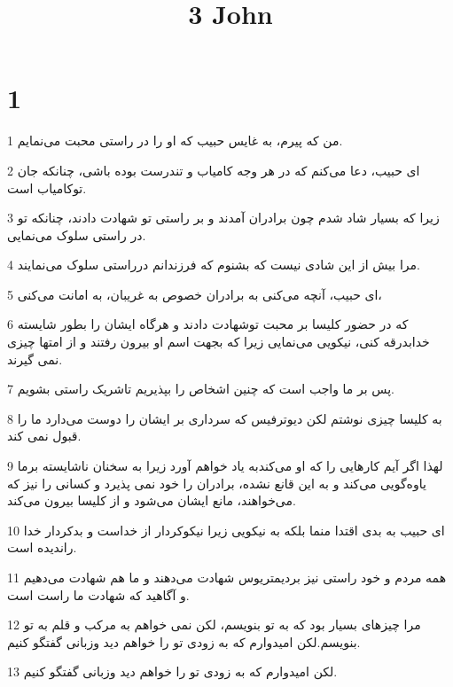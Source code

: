 

\title{3 John}


\chapter{1}

\par 1 من که پیرم، به غایس حبیب که او را در راستی محبت می‌نمایم.
\par 2 ‌ای حبیب، دعا می‌کنم که در هر وجه کامیاب و تندرست بوده باشی، چنانکه جان توکامیاب است.
\par 3 زیرا که بسیار شاد شدم چون برادران آمدند و بر راستی تو شهادت دادند، چنانکه تو در راستی سلوک می‌نمایی.
\par 4 مرا بیش از این شادی نیست که بشنوم که فرزندانم درراستی سلوک می‌نمایند.
\par 5 ‌ای حبیب، آنچه می‌کنی به برادران خصوص به غریبان، به امانت می‌کنی،
\par 6 که در حضور کلیسا بر محبت توشهادت دادند و هرگاه ایشان را بطور شایسته خدابدرقه کنی، نیکویی می‌نمایی زیرا که بجهت اسم او بیرون رفتند و از امتها چیزی نمی گیرند.
\par 7 پس بر ما واجب است که چنین اشخاص را بپذیریم تاشریک راستی بشویم.
\par 8 به کلیسا چیزی نوشتم لکن دیوترفیس که سرداری بر ایشان را دوست می‌دارد ما را قبول نمی کند.
\par 9 لهذا اگر آیم کارهایی را که او می‌کندبه یاد خواهم آورد زیرا به سخنان ناشایسته برما یاوه‌گویی می‌کند و به این قانع نشده، برادران را خود نمی پذیرد و کسانی را نیز که می‌خواهند، مانع ایشان می‌شود و از کلیسا بیرون می‌کند.
\par 10 ‌ای حبیب به بدی اقتدا منما بلکه به نیکویی زیرا نیکو‌کردار از خداست و بدکردار خدا راندیده است.
\par 11 همه مردم و خود راستی نیز بردیمتریوس شهادت می‌دهند و ما هم شهادت می‌دهیم و آگاهید که شهادت ما راست است.
\par 12 مرا چیزهای بسیار بود که به تو بنویسم، لکن نمی خواهم به مرکب و قلم به تو بنویسم.لکن امیدوارم که به زودی تو را خواهم دید وزبانی گفتگو کنیم.
\par 13 لکن امیدوارم که به زودی تو را خواهم دید وزبانی گفتگو کنیم.



